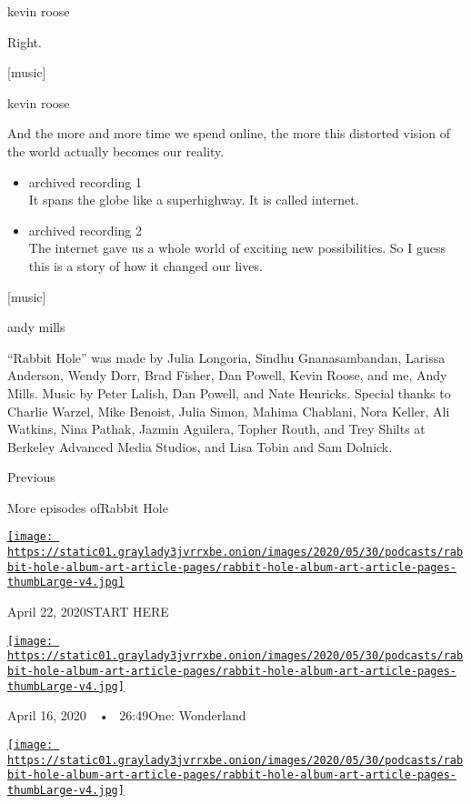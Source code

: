 kevin roose

Right.

{[}music{]}

kevin roose

And the more and more time we spend online, the more this distorted
vision of the world actually becomes our reality.

\begin{itemize}
\item
  archived recording 1\\
  It spans the globe like a superhighway. It is called internet.
\item
  archived recording 2\\
  The internet gave us a whole world of exciting new possibilities. So I
  guess this is a story of how it changed our lives.
\end{itemize}

{[}music{]}

andy mills

``Rabbit Hole'' was made by Julia Longoria, Sindhu Gnanasambandan,
Larissa Anderson, Wendy Dorr, Brad Fisher, Dan Powell, Kevin Roose, and
me, Andy Mills. Music by Peter Lalish, Dan Powell, and Nate Henricks.
Special thanks to Charlie Warzel, Mike Benoist, Julia Simon, Mahima
Chablani, Nora Keller, Ali Watkins, Nina Pathak, Jazmin Aguilera, Topher
Routh, and Trey Shilts at Berkeley Advanced Media Studios, and Lisa
Tobin and Sam Dolnick.

Previous

More episodes ofRabbit Hole

\href{https://www.nytimes3xbfgragh.onion/2020/04/22/podcasts/rabbit-hole-prologue.html?action=click\&module=audio-series-bar\&region=header\&pgtype=Article}{\texttt{[image: https://static01.graylady3jvrrxbe.onion/images/2020/05/30/podcasts/rabbit-hole-album-art-article-pages/rabbit-hole-album-art-article-pages-thumbLarge-v4.jpg]}}

April 22, 2020START HERE

\href{https://www.nytimes3xbfgragh.onion/2020/04/16/podcasts/rabbit-hole-internet-youtube-virus.html?action=click\&module=audio-series-bar\&region=header\&pgtype=Article}{\texttt{[image: https://static01.graylady3jvrrxbe.onion/images/2020/05/30/podcasts/rabbit-hole-album-art-article-pages/rabbit-hole-album-art-article-pages-thumbLarge-v4.jpg]}}

April 16, 2020~~•~ 26:49One: Wonderland

\href{https://www.nytimes3xbfgragh.onion/2020/04/23/podcasts/rabbit-hole-internet-youtube-virus.html?action=click\&module=audio-series-bar\&region=header\&pgtype=Article}{\texttt{[image: https://static01.graylady3jvrrxbe.onion/images/2020/05/30/podcasts/rabbit-hole-album-art-article-pages/rabbit-hole-album-art-article-pages-thumbLarge-v4.jpg]}}

